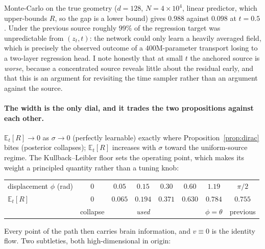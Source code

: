 \documentclass[11pt,a4paper]{article}
\newcommand{\E}{\mathbb{E}}
\theoremstyle{plain}
\theoremstyle{remark}
\begin{document}
\noindent
Monte-Carlo on the true geometry ($d=128$, $N=4\times10^4$, linear predictor,
which upper-bounds $R$, so the gap is a lower bound) gives $0.988$ against
$0.098$ at $t=0.5$. Under the previous source roughly $99\%$ of the regression
target was unpredictable from $(z_t,t)$: the network could only learn a heavily
averaged field, which is precisely the observed outcome of a $400$M-parameter
transport losing to a two-layer regression head. I note honestly that at small
$t$ the anchored source is \emph{worse}, because a concentrated source reveals
little about the residual early, and that this is an argument for revisiting the
time sampler rather than an argument against the source.

\paragraph{The width is the only dial, and it trades the two propositions
against each other.} $\E_t[R]\to0$ as $\sigma\to0$ (perfectly learnable) exactly
where Proposition~\ref{prop:dirac} bites (posterior collapses); $\E_t[R]$
increases with $\sigma$ toward the uniform-source regime. The
Kullback--Leibler floor sets the operating point, which makes its weight a
principled quantity rather than a tuning knob:

\begin{center}
\footnotesize
\begin{tabular}{@{}lccccccc@{}}
\toprule
displacement $\phi$ (rad) & $0$ & $0.05$ & $0.15$ & $0.30$ & $0.60$ & $1.19$ & $\pi/2$ \\
$\E_t[R]$ & $0$ & $0.065$ & $\mathbf{0.194}$ & $0.371$ & $0.630$ & $0.784$ & $0.755$ \\
 & collapse & & \emph{used} & & & $\phi=\theta$ & previous \\
\bottomrule
\end{tabular}
\end{center}

Every point of the path then carries brain information, and $v\equiv0$ is the
identity flow. Two subtleties, both high-dimensional in origin:
\end{document}
